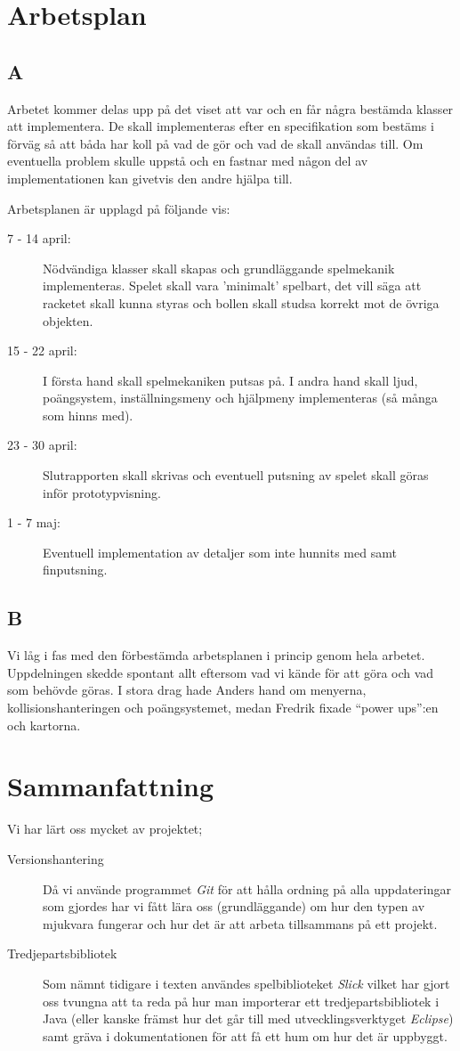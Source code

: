 \documentclass[11pt,a4paper]{article}
\begin{document}
\section{Arbetsplan}

\subsection{A}
Arbetet kommer delas upp på det viset att var och en får några bestämda klasser att implementera. De skall implementeras efter en specifikation som bestäms i förväg så att båda har koll på vad de gör och vad de skall användas till. Om eventuella problem skulle uppstå och en fastnar med någon del av implementationen kan givetvis den andre hjälpa till.

Arbetsplanen är upplagd på följande vis:

\begin{description}
	\item[7 - 14 april:] Nödvändiga klasser skall skapas och grundläggande spelmekanik implementeras. Spelet skall vara 'minimalt' spelbart, det vill säga att racketet skall kunna styras och bollen skall studsa korrekt mot de övriga objekten.
	\item[15 - 22 april:] I första hand skall spelmekaniken putsas på. I andra hand skall ljud, poängsystem, inställningsmeny och hjälpmeny implementeras (så många som hinns med).
	\item[23 - 30 april:] Slutrapporten skall skrivas och eventuell putsning av spelet skall göras inför prototypvisning.
	\item[1 - 7 maj:] Eventuell implementation av detaljer som inte hunnits med samt finputsning.
\end{description}

\subsection{B}
Vi låg i fas med den förbestämda arbetsplanen i princip genom hela arbetet. Uppdelningen skedde spontant allt eftersom vad vi kände för att göra och vad som behövde göras. I stora drag hade Anders hand om menyerna, kollisionshanteringen och poängsystemet, medan Fredrik fixade ``power ups'':en och kartorna.

\section{Sammanfattning}
Vi har lärt oss mycket av projektet;

\begin{description}
	\item[Versionshantering] Då vi använde programmet \emph{Git} för att hålla ordning på alla uppdateringar som gjordes har vi fått lära oss (grundläggande) om hur den typen av mjukvara fungerar och hur det är att arbeta tillsammans på ett projekt.
	\item[Tredjepartsbibliotek] Som nämnt tidigare i texten användes spelbiblioteket \emph{Slick} vilket har gjort oss tvungna att ta reda på hur man importerar ett tredjepartsbibliotek i Java (eller kanske främst hur det går till med utvecklingsverktyget \emph{Eclipse}) samt gräva i dokumentationen för att få ett hum om hur det är uppbyggt.
\end{description}
\end{document}
